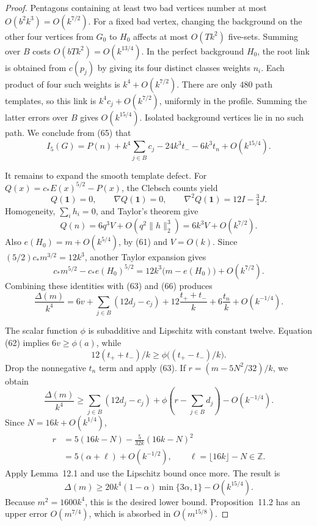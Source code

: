 \begin{proof}
Pentagons containing at least two bad vertices number at most
$O(b^2k^3)=O(k^{7/2})$. For a fixed bad vertex, changing the background
on the other four vertices from $G_0$ to $H_0$ affects at most
$O(Tk^2)$ five-sets. Summing over $B$ costs $O(bTk^2)=O(k^{13/4})$.
In the perfect background $H_0$, the root link is obtained from $c(p_j)$
by giving its four distinct classes weights $n_i$. Each product of four
such weights is $k^4+O(k^{7/2})$. There are only $480$ path templates, so
this link is $k^4c_j+O(k^{7/2})$, uniformly in the profile. Summing the
latter errors over $B$ gives $O(k^{15/4})$. Isolated background vertices
lie in no such path. We conclude from (65) that
\begin{equation}\tag{66}\label{eq:phase-pentagon-count}
 I_5(G)=P(n)+k^4\sum_{j\in B}c_j-24k^3t_--6k^3t_n+O(k^{15/4}).
\end{equation}

It remains to expand the smooth template defect. For
$Q(x)=c_\ast E(x)^{5/2}-P(x)$, the Clebsch counts yield
\[
 Q(\mathbf1)=0,\qquad\nabla Q(\mathbf1)=0,\qquad
 \nabla^2Q(\mathbf1)=12I-\tfrac34J.
\]
Homogeneity, $\sum_i h_i=0$, and Taylor's theorem give
\[
 Q(n)=6q^3V+O(q^2\lVert h\rVert_2^3)=6k^3V+O(k^{7/2}).
\]
Also $e(H_0)=m+O(k^{5/4})$, by (61) and $V=O(k)$. Since
$(5/2)c_\ast m^{3/2}=12k^3$, another Taylor expansion gives
\[
 c_\ast m^{5/2}-c_\ast e(H_0)^{5/2}
   =12k^3\bigl(m-e(H_0)\bigr)+O(k^{7/2}).
\]
Combining these identities with (63) and (66) produces
\begin{equation}\tag{67}\label{eq:phase-deficit}
 \frac{\Delta(m)}{k^4}
 =6v+\sum_{j\in B}(12d_j-c_j)
    +12\frac{t_++t_-}{k}+6\frac{t_n}{k}+O(k^{-1/4}).
\end{equation}

The scalar function $\phi$ is subadditive and Lipschitz with constant
twelve. Equation (62) implies $6v\geq\phi(a)$, while
\[
 12(t_++t_-)/k\geq\phi\bigl((t_+-t_-)/k\bigr).
\]
Drop the nonnegative $t_n$ term and apply (63). If
$r=(m-5N^2/32)/k$, we obtain
\[
 \frac{\Delta(m)}{k^4}
 \geq\sum_{j\in B}(12d_j-c_j)
    +\phi\left(r-\sum_{j\in B}d_j\right)-O(k^{-1/4}).
\]
Since $N=16k+O(k^{1/4})$,
\begin{align*}
 r&=5(16k-N)-\frac{5}{32k}(16k-N)^2\\
  &=5(\alpha+\ell)+O(k^{-1/2}),\qquad
       \ell=\lfloor16k\rfloor-N\in\mathbb Z.
\end{align*}
Apply Lemma~12.1 and use the Lipschitz bound once more. The result is
\[
 \Delta(m)\geq20k^4(1-\alpha)\min\{3\alpha,1\}-O(k^{15/4}).
\]
Because $m^2=1600k^4$, this is the desired lower bound.
Proposition~11.2 has an upper error $O(m^{7/4})$, which is absorbed in
$O(m^{15/8})$.
\end{proof}

